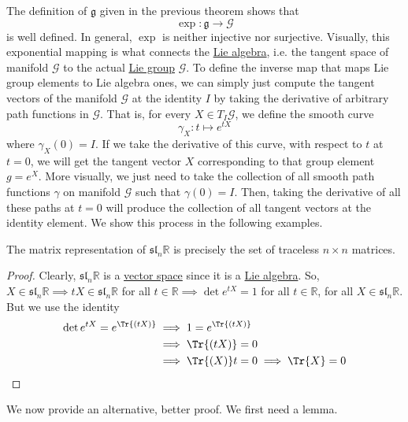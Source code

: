  The definition of $\mathfrak{g}$ given in the previous theorem shows that 
  \begin{equation}
    \exp: \mathfrak{g} \rightarrow \mathcal{G}
  \end{equation}
  is well defined. In general, $\exp$ is neither injective nor surjective. Visually, this exponential mapping is what connects the \hyperref[def:lie-algebra]{Lie algebra}, i.e. the tangent space of manifold $\mathcal{G}$ to the actual \hyperref[def:lie-group]{Lie group} $\mathcal{G}$. To define the inverse map that maps Lie group elements to Lie algebra ones, we can simply just compute the tangent vectors of the manifold $\mathcal{G}$ at the identity $I$ by taking the derivative of arbitrary path functions in $\mathcal{G}$. That is, for every $X \in T_I \mathcal{G}$, we define the smooth curve 
  \begin{equation}
    \gamma_X: t \mapsto e^{tX}
  \end{equation}
  where $\gamma_X(0) = I$. If we take the derivative of this curve, with respect to $t$ at $t = 0$, we will get the tangent vector $X$ corresponding to that group element $g = e^{X}$. More visually, we just need to take the collection of all smooth path functions $\gamma$ on manifold $\mathcal{G}$ such that $\gamma(0) = I$. Then, taking the derivative of all these paths at $t = 0$ will produce the collection of all tangent vectors at the identity element. We show this process in the following examples. 

  \begin{theorem}
    \label{thm:matrix-form-of-mathfrakslnr}
    The matrix representation of $\mathfrak{sl}_n \mathbb{R}$ is precisely the set of traceless $n \times n$ matrices. 
  \end{theorem}

  \begin{proof}
    Clearly, $\mathfrak{sl}_n \mathbb{R}$ is a \hyperref[def:vector-space]{vector space} since it is a \hyperref[def:lie-algebra]{Lie algebra}. So, $X \in \mathfrak{sl}_n \mathbb{R} \implies t X \in \mathfrak{sl}_n \mathbb{R}$ for all $t \in \mathbb{R} \implies \det{e^{tX}} = 1$ for all $t \in \mathbb{R}$, for all $X \in \mathfrak{sl}_n \mathbb{R}$. But we use the identity 
    \begin{align*}
      \det{e^{tX}} = e^{\Tr{(tX)}} & \implies 1 = e^{\Tr{(t X)}} \\
      & \implies \Tr{(tX)} = 0 \\
      & \implies \Tr{(X)} t = 0 \implies \Tr{X} = 0
    \end{align*}
  \end{proof}
  We now provide an alternative, better proof. We first need a lemma. 

